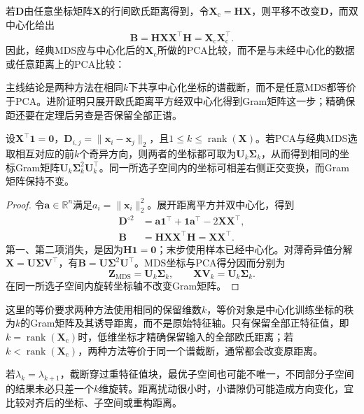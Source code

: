 若$\bm{D}$由任意坐标矩阵$\bm{X}$的行间欧氏距离得到，令$\bm{X}_{\mathrm{c}}=\bm{H}\bm{X}$，则平移不改变$\bm{D}$，而双中心化给出
\[
  \bm{B}=\bm{H}\bm{X}\bm{X}^{\top}\bm{H}
  =\bm{X}_{\mathrm{c}}\bm{X}_{\mathrm{c}}^{\top}.
\]
因此，经典MDS应与中心化后的$\bm{X}_{\mathrm{c}}$所做的PCA比较，而不是与未经中心化的数据或任意距离上的PCA比较：

主线结论是两种方法在相同$k$下共享中心化坐标的谱截断，而不是任意MDS都等价于PCA。进阶证明只展开欧氏距离平方经双中心化得到Gram矩阵这一步；精确保距还要在定理后另查是否保留全部正谱。

\begin{theorem}[欧氏距离下经典MDS与PCA的关系]
  \label{thm:dim-mds-pca}
  设$\bm{X}^{\top}\bm{1}=\bm{0}$，$\bm{D}_{i,j}=\lVert\bm{x}_i-\bm{x}_j\rVert_2$，且$1\leq k\leq\operatorname{rank}(\bm{X})$。若PCA与经典MDS选取相互对应的前$k$个奇异方向，则两者的坐标都可取为$\bm{U}_k\bm{\Sigma}_k$，从而得到相同的坐标Gram矩阵$\bm{U}_k\bm{\Sigma}_k^2\bm{U}_k^{\top}$。同一所选子空间内的坐标可相差右侧正交变换，而Gram矩阵保持不变。
\end{theorem}
\begin{proof}
  令$\bm{a}\in\mathbb{R}^n$满足$a_i=\lVert\bm{x}_i\rVert_2^2$。展开距离平方并双中心化，得到
  \[
    \begin{aligned}
      \bm{D}^{\circ2}
        &=\bm{a}\bm{1}^{\top}+\bm{1}\bm{a}^{\top}
          -2\bm{X}\bm{X}^{\top},\\
      \bm{B}
        &=\bm{H}\bm{X}\bm{X}^{\top}\bm{H}
         =\bm{X}\bm{X}^{\top}.
    \end{aligned}
  \]
  第一、第二项消失，是因为$\bm{H}\bm{1}=\bm{0}$；末步使用样本已经中心化。对薄奇异值分解$\bm{X}=\bm{U}\bm{\Sigma}\bm{V}^{\top}$，有$\bm{B}=\bm{U}\bm{\Sigma}^2\bm{U}^{\top}$。MDS坐标与PCA得分因而分别为
  \[
    \bm{Z}_{\mathrm{MDS}}=\bm{U}_k\bm{\Sigma}_k,
    \qquad
    \bm{X}\bm{V}_k=\bm{U}_k\bm{\Sigma}_k.
  \]
  在同一所选子空间内旋转坐标轴不改变Gram矩阵。
\end{proof}

这里的等价要求两种方法使用相同的保留维数$k$，等价对象是中心化训练坐标的秩为$k$的Gram矩阵及其诱导距离，而不是原始特征轴。只有保留全部正特征值，即$k=\operatorname{rank}(\bm{X}_{\mathrm{c}})$时，低维坐标才精确保留输入的全部欧氏距离；若$k<\operatorname{rank}(\bm{X}_{\mathrm{c}})$，两种方法等价于同一个谱截断，通常都会改变原距离。

若$\lambda_k=\lambda_{k+1}$，截断穿过重特征值块，最优子空间也可能不唯一，不同部分子空间的结果未必只差一个$k$维旋转。距离扰动很小时，小谱隙仍可能造成方向变化，宜比较对齐后的坐标、子空间或重构距离。

